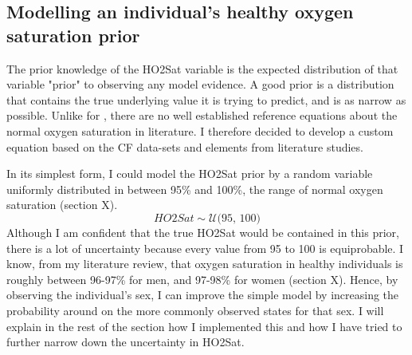 \subsection{Modelling an individual's healthy oxygen saturation prior} \label{sec:ho2sat}
The prior knowledge of the HO2Sat variable is the expected distribution of that variable "prior" to observing any model evidence. A good prior is a distribution that contains the true underlying value it is trying to predict, and is as narrow as possible. Unlike for \F, there are no well established reference equations about the normal oxygen saturation in literature. I therefore decided to develop a custom equation based on the CF data-sets and elements from literature studies. 



In its simplest form, I could model the HO2Sat prior by a random variable uniformly distributed in between 95\% and 100\%, the range of normal oxygen saturation (section X).
\[
HO2Sat \sim \mathcal{U}\bigl(95,\,100\bigr)
\]
Although I am confident that the true HO2Sat would be contained in this prior, there is a lot of uncertainty because every value from 95 to 100 is equiprobable. I know, from my literature review, that oxygen saturation in healthy individuals is roughly between 96-97\% for men, and 97-98\% for women (section X). Hence, by observing the individual's sex, I can improve the simple model by increasing the probability around on the more commonly observed states for that sex. I will explain in the rest of the section how I implemented this and how I have tried to further narrow down the uncertainty in HO2Sat.

